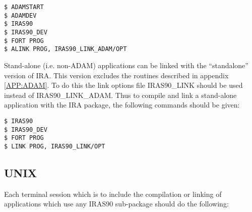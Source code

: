 \begin{verbatim}
$ ADAMSTART
$ ADAMDEV
$ IRAS90
$ IRAS90_DEV
$ FORT PROG
$ ALINK PROG, IRAS90_LINK_ADAM/OPT
\end{verbatim}

Stand-alone (i.e. non-ADAM) applications can be linked with the ``standalone''
version of IRA. This version excludes the routines described in appendix
\ref{APP:ADAM}. To do this the link options file IRAS90\_LINK should be used
instead of IRAS90\_LINK\_ADAM. Thus to compile and link a stand-alone
application with the IRA package, the following commands should be given:

\begin{verbatim}
$ IRAS90
$ IRAS90_DEV
$ FORT PROG
$ LINK PROG, IRAS90_LINK/OPT
\end{verbatim}

\subsection{UNIX}


Each terminal session which is to include the compilation or linking of
applications which use any IRAS90 sub-package should do the following:

